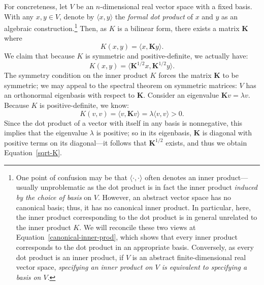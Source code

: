 \documentclass[twoside,11pt]{homework}
\begin{document}
\begin{multicols}{2}
For concreteness, let $V$ be an $n$-dimensional real vector space with a fixed basis.
With any $x,y \in V$, denote by $\langle x,y\rangle$ the \emph{formal dot product} of
$x$ and $y$ as an algebraic construction.\footnote{One point of confusion may be that
  $\langle \cdot,\cdot \rangle$ often denotes an inner product---usually unproblematic
  as the dot product is in fact the inner product \emph{induced by the choice of basis}
  on $V$. However, an abstract vector space has no canonical basis; thus, it has no
  canonical inner product. In particular, here, the inner product corresponding to the
  dot product is in general unrelated to the inner product $K$. We will reconcile these
  two views at Equation~\ref{canonical-inner-prod}, which shows that every inner product
  corresponds to the dot product in an appropriate basis. Conversely, as every dot product
  is an inner product, if $V$ is an abstract finite-dimensional real vector space,
  \emph{specifying an inner product on $V$ is equivalent to specifying a basis on $V$}.}
Then, as $K$ is a bilinear form, there exists a matrix $\mathbf{K}$ where
\begin{equation}\label{kernel-history}
  K(x,y) = \langle x, \mathbf{K}y\rangle.
\end{equation}
We claim that because $K$ is symmetric and positive-definite, we actually have:
\begin{equation}\label{sqrt-K}
  K(x,y) = \langle \mathbf{K}^{1/2} x, \mathbf{K}^{1/2}y\rangle.
\end{equation}
The symmetry condition on the inner product $K$ forces the matrix $\mathbf{K}$ to be
symmetric; we may appeal to the spectral theorem on symmetric matrices: $V$ has an
orthonormal eigenbasis with respect to $\mathbf{K}$. Consider an eigenvalue
$\mathbf{K} v = \lambda v$. Because $K$ is positive-definite, we know:
\[K(v,v) = \langle v, \mathbf{K}v\rangle = \lambda \langle v,v\rangle> 0.\]
Since the dot product of a vector with itself in any basis is nonnegative, this implies
that the eigenvalue $\lambda$ is positive; so in its eigenbasis, $\mathbf{K}$ is diagonal
with positive terms on its diagonal---it follows that $\mathbf{K}^{1/2}$ exists, and thus
we obtain Equation~\ref{sqrt-K}.


\end{multicols}
\end{document}
